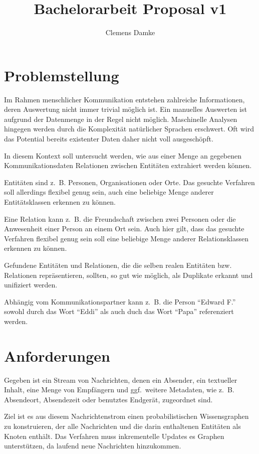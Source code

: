 \documentclass[12pt,a4paper,bibliography=totocnumbered,listof=totocnumbered]{scrartcl}
\title{Bachelorarbeit Proposal v1}
\author{Clemens Damke}
\begin{document}
{ \maketitle}

\section{Problemstellung}

Im Rahmen menschlicher Kommunikation entstehen zahlreiche Informationen, deren Auswertung nicht immer trivial möglich ist. Ein manuelles Auswerten ist aufgrund der Datenmenge in der Regel nicht möglich. Maschinelle Analysen hingegen werden durch die Komplexität natürlicher Sprachen erschwert. Oft wird das Potential bereits existenter Daten daher nicht voll ausgeschöpft.

In diesem Kontext soll untersucht werden, wie aus einer Menge an gegebenen Kommunikationsdaten Relationen zwischen Entitäten extrahiert werden können.

Entitäten sind z.~B. Personen, Organisationen oder Orte. Das gesuchte Verfahren soll allerdings flexibel genug sein, auch eine beliebige Menge anderer Entitätsklassen erkennen zu können.

Eine Relation kann z.~B. die Freundschaft zwischen zwei Personen oder die Anwesenheit einer Person an einem Ort sein. Auch hier gilt, dass das gesuchte Verfahren flexibel genug sein soll eine beliebige Menge anderer Relationsklassen erkennen zu können.

Gefundene Entitäten und Relationen, die die selben realen Entitäten bzw. Relationen repräsentieren, sollten, so gut wie möglich, als Duplikate erkannt und unifiziert werden.

Abhängig vom Kommunikationspartner kann z.~B. die Person "`Edward F."' sowohl durch das Wort "`Eddi"' als auch duch das Wort "`Papa"' referenziert werden.

\section{Anforderungen}

Gegeben ist ein Stream von Nachrichten, denen ein Absender, ein textueller Inhalt, eine Menge von Empfängern und ggf.\ weitere Metadaten, wie z.~B. Absendeort, Absendezeit oder benutztes Endgerät, zugeordnet sind.

Ziel ist es aus diesem Nachrichtenstrom einen probabilistischen Wissensgraphen zu konstruieren, der alle Nachrichten und die darin enthaltenen Entitäten als Knoten enthält. Das Verfahren muss inkrementelle Updates es Graphen unterstützen, da laufend neue Nachrichten hinzukommen.
\end{document}
